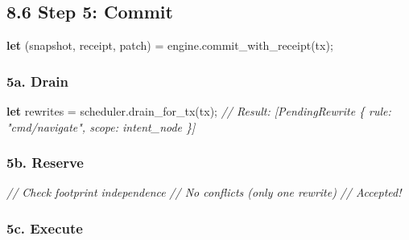 \documentclass[
]{book}
\newenvironment{Shaded}{}{}
\newcommand{\CommentTok}[1]{\textcolor[rgb]{0.38,0.63,0.69}{\textit{#1}}}
\newcommand{\KeywordTok}[1]{\textcolor[rgb]{0.00,0.44,0.13}{\textbf{#1}}}
\newcommand{\NormalTok}[1]{#1}
\newcommand{\OperatorTok}[1]{\textcolor[rgb]{0.40,0.40,0.40}{#1}}
\begin{document}
\subsection{8.6 Step 5: Commit}\label{step-5-commit}

\begin{Shaded}
\begin{Highlighting}[]
\KeywordTok{let}\NormalTok{ (snapshot}\OperatorTok{,}\NormalTok{ receipt}\OperatorTok{,}\NormalTok{ patch) }\OperatorTok{=}\NormalTok{ engine}\OperatorTok{.}\NormalTok{commit\_with\_receipt(tx)}\OperatorTok{;}
\end{Highlighting}
\end{Shaded}

\subsubsection{5a. Drain}\label{a.-drain}

\begin{Shaded}
\begin{Highlighting}[]
\KeywordTok{let}\NormalTok{ rewrites }\OperatorTok{=}\NormalTok{ scheduler}\OperatorTok{.}\NormalTok{drain\_for\_tx(tx)}\OperatorTok{;}
\CommentTok{// Result: [PendingRewrite \{ rule: "cmd/navigate", scope: intent\_node \}]}
\end{Highlighting}
\end{Shaded}

\subsubsection{5b. Reserve}\label{b.-reserve}

\begin{Shaded}
\begin{Highlighting}[]
\CommentTok{// Check footprint independence}
\CommentTok{// No conflicts (only one rewrite)}
\CommentTok{// Accepted!}
\end{Highlighting}
\end{Shaded}

\subsubsection{5c. Execute}\label{c.-execute}
\end{document}
